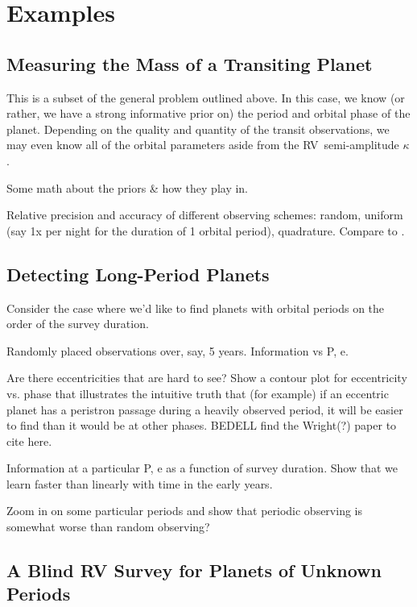 \documentclass[10pt, letterpaper]{article}
\newcommand{\acronym}[1]{{\small{#1}}}
\newcommand{\rv}{\acronym{RV}}
\begin{document}
\section{Examples}

\subsection{Measuring the Mass of a Transiting Planet}

This is a subset of the general problem outlined above. In this case, 
we know (or rather, we have a strong informative prior on) the period 
and orbital phase of the planet. Depending on the quality and quantity 
of the transit observations, we may even know all of the orbital parameters 
aside from the \rv\ semi-amplitude $\kappa$.

Some math about the priors \& how they play in.

Relative precision and accuracy of different observing schemes: random, 
uniform (say 1x per night for the duration of 1 orbital period), quadrature. 
Compare to \cite{Burt2018}.

\subsection{Detecting Long-Period Planets}

Consider the case where we'd like to find planets with orbital periods 
on the order of the survey duration.

Randomly placed observations over, say, 5 years. Information vs P, e.

Are there eccentricities that are hard to see? Show a contour plot for 
eccentricity vs. phase that illustrates the intuitive truth that (for example) 
if an eccentric planet has a peristron passage during a heavily observed 
period, it will be easier to find than it would be at other phases. BEDELL 
find the Wright(?) paper to cite here.

Information at a particular P, e as a function of survey duration. Show
that we learn faster than linearly with time in the early years.

Zoom in on some particular periods and show that periodic observing is
somewhat worse than random observing?

\subsection{A Blind RV Survey for Planets of Unknown Periods}
\end{document}
